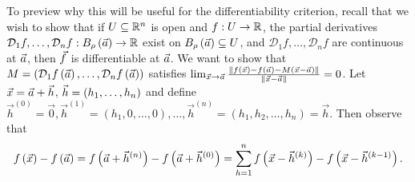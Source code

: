 \documentclass[main.tex]{subfiles}
\begin{document}
To preview why this will be useful for the differentiability criterion, recall that we wish to show that if $U\subseteq \mathbb R^n$ is open and $f : U \to \mathbb R$, the partial derivatives $\mathcal{D}_1f, \ldots , \mathcal{D}_nf : B_\rho\left( \vec{a} \right) \to \mathbb R$ exist on $B_\rho\left( \vec{a} \right) \subseteq U$, and $\mathcal{D}_1f, \ldots , \mathcal{D}_nf$ are continuous at $\vec{a}$, then $\vec{f}$ is differentiable at $\vec{a}$. We want to show that $M = \left( \mathcal{D}_1f\left( \vec{a} \right), \ldots , \mathcal{D}_nf\left( \vec{a} \right) \right)$ satisfies $\lim_{\vec{x}\to \vec{a}} \frac{\left\lVert f\left( \vec{x} \right) - f\left( \vec{a} \right) - M \left( \vec{x} - \vec{a} \right) \right\rVert}{\left\lVert \vec{x} - \vec{a} \right\rVert} = 0$. Let $\vec{x} = \vec{a} + \vec{h}$, $\vec{h} = (h_1, \ldots , h_n)$ and define $\vec{h}^{(0)} = \vec{0}, \vec{h}^{(1)} = (h_1, 0, \ldots , 0), \ldots , \vec{h}^{(n)} = (h_1, h_2, \ldots , h_n) = \vec{h}$. Then observe that
\[f\left( \vec{x} \right) - f\left( \vec{a} \right) = f\left( \vec{a} + \vec{h}^{(n)} \right) - f\left( \vec{a} + \vec{h}^{(0)} \right) = \sum_{h = 1}^n f\left( \vec{x} - \vec{h}^{(k)} \right) - f\left( \vec{x} - \vec{h}^{(k - 1)} \right).\]
\end{document}
